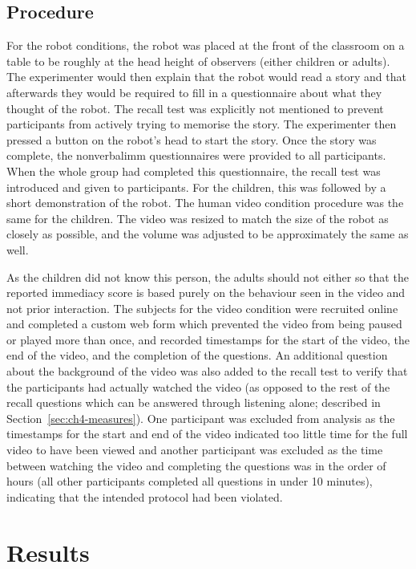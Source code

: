\subsection{Procedure}
For the robot conditions, the robot was placed at the front of the classroom on a table to be roughly at the head height of observers (either children or adults). The experimenter would then explain that the robot would read a story and that afterwards they would be required to fill in a questionnaire about what they thought of the robot. The recall test was explicitly not mentioned to prevent participants from actively trying to memorise the story. The experimenter then pressed a button on the robot's head to start the story. Once the story was complete, the \gls{nonverbalimm} questionnaires were provided to all participants. When the whole group had completed this questionnaire, the recall test was introduced and given to participants. For the children, this was followed by a short demonstration of the robot. The human video condition procedure was the same for the children. The video was resized to match the size of the robot as closely as possible, and the volume was adjusted to be approximately the same as well.

As the children did not know this person, the adults should not either so that the reported \gls{immediacy} score is based purely on the behaviour seen in the video and not prior interaction. The subjects for the video condition were recruited online and completed a custom web form which prevented the video from being paused or played more than once, and recorded timestamps for the start of the video, the end of the video, and the completion of the questions. An additional question about the background of the video was also added to the recall test to verify that the participants had actually watched the video (as opposed to the rest of the recall questions which can be answered through listening alone; described in Section~\ref{sec:ch4-measures}). One participant was excluded from analysis as the timestamps for the start and end of the video indicated too little time for the full video to have been viewed and another participant was excluded as the time between watching the video and completing the questions was in the order of hours (all other participants completed all questions in under 10 minutes), indicating that the intended protocol had been violated.

\section{Results} \label{sec:nvi-results}
